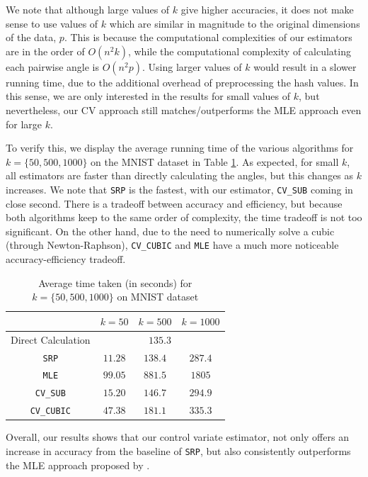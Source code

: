 \documentclass[runningheads]{llncs}
\begin{document}
    We note that although large values of $k$ give higher accuracies, it does not make sense to use values of $k$ which are similar in magnitude to the original dimensions of the data, $p$. This is because the computational complexities of our estimators are in the order of $O(n^2k)$, while the computational complexity of calculating each pairwise angle is $O(n^2p)$. Using larger values of $k$ would result in a slower running time, due to the additional overhead of preprocessing the hash values. In this sense, we are only interested in the results for small values of $k$, but nevertheless, our CV approach still matches/outperforms the MLE approach even for large $k$.

    To verify this, we display the average running time of the various algorithms for $k=\{50, 500, 1000\}$ on the MNIST dataset in Table \ref{table:timings}. As expected, for small $k$, all estimators are faster than directly calculating the angles, but this changes as $k$ increases. We note that \verb|SRP| is the fastest, with our estimator, \verb|CV_SUB| coming in close second. There is a tradeoff between accuracy and efficiency, but because both algorithms keep to the same order of complexity, the time tradeoff is not too significant. On the other hand, due to the need to numerically solve a cubic (through Newton-Raphson), \verb|CV_CUBIC| and \verb|MLE| have a much more noticeable accuracy-efficiency tradeoff.
        \begin{table}[h]
            \small
            \centering
            \caption{Average time taken (in seconds) for $k = \{50,500,1000\}$ on MNIST dataset}
            \label{table:timings}
            \begin{tabular}{|c|c|c|c|}
                \hline             & $k=50$ & $k=500$ & $k=1000$ \\ \hline
                Direct Calculation & \multicolumn{3}{c|}{$135.3$}      \\ \hline
                \verb|SRP|         & $11.28$   & $138.4$    & $287.4$     \\ \hline
                \verb|MLE|         & $99.05$   & $881.5$    & $1805$     \\ \hline 
                \verb|CV_SUB|      & $15.20$   & $146.7$    & $294.9$     \\ \hline
                \verb|CV_CUBIC|    & $47.38$   & $181.1$    & $335.3$     \\ \hline
            \end{tabular}
        \end{table}
    Overall, our results shows that our control variate estimator, not only offers an increase in accuracy from the baseline of \verb|SRP|, but also consistently outperforms the MLE approach proposed by \cite{kang2018improving}.
    
\end{document}

